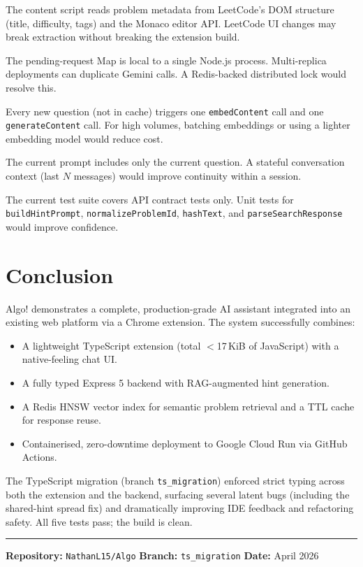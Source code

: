\documentclass[11pt,a4paper]{article}
\begin{document}
\begin{description}[noitemsep]
  \item[DOM coupling] The content script reads problem metadata from LeetCode's
    DOM structure (title, difficulty, tags) and the Monaco editor API.  LeetCode
    UI changes may break extraction without breaking the extension build.

  \item[In-process deduplication] The pending-request Map is local to a single
    Node.js process.  Multi-replica deployments can duplicate Gemini calls.  A
    Redis-backed distributed lock would resolve this.

  \item[Embedding cost] Every new question (not in cache) triggers one
    \texttt{embedContent} call and one \texttt{generateContent} call.  For high
    volumes, batching embeddings or using a lighter embedding model would reduce
    cost.

  \item[No conversation history] The current prompt includes only the current
    question.  A stateful conversation context (last $N$ messages) would improve
    continuity within a session.

  \item[Test coverage] The current test suite covers API contract tests only.
    Unit tests for \texttt{buildHintPrompt}, \texttt{normalizeProblemId},
    \texttt{hashText}, and \texttt{parseSearchResponse} would improve confidence.
\end{description}

\section{Conclusion}

Algo! demonstrates a complete, production-grade AI assistant integrated into an
existing web platform via a Chrome extension.  The system successfully combines:

\begin{itemize}[noitemsep]
  \item A lightweight TypeScript extension (total $<$17\,KiB of JavaScript) with
        a native-feeling chat UI.
  \item A fully typed Express 5 backend with RAG-augmented hint generation.
  \item A Redis HNSW vector index for semantic problem retrieval and a TTL cache
        for response reuse.
  \item Containerised, zero-downtime deployment to Google Cloud Run via GitHub
        Actions.
\end{itemize}

The TypeScript migration (branch \texttt{ts\_migration}) enforced strict typing
across both the extension and the backend, surfacing several latent bugs
(including the shared-hint spread fix) and dramatically improving IDE feedback
and refactoring safety.  All five tests pass; the build is clean.

\bigskip
\hrule
\bigskip
\noindent\footnotesize
\textbf{Repository:} \texttt{NathanL15/Algo} \quad
\textbf{Branch:} \texttt{ts\_migration} \quad
\textbf{Date:} April 2026
\end{document}
